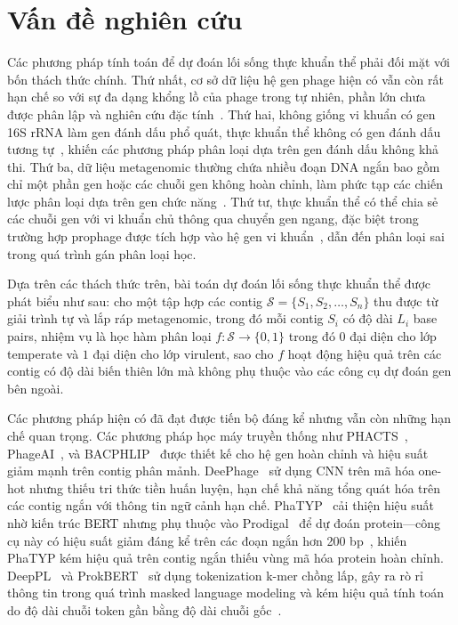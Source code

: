 \section{Vấn đề nghiên cứu}
\label{sec:problem}

Các phương pháp tính toán để dự đoán lối sống thực khuẩn thể phải đối mặt với bốn thách thức chính. Thứ nhất, cơ sở dữ liệu hệ gen phage hiện có vẫn còn rất hạn chế so với sự đa dạng khổng lồ của phage trong tự nhiên, phần lớn chưa được phân lập và nghiên cứu đặc tính~\cite{hayes2017metagenomic}. Thứ hai, không giống vi khuẩn có gen 16S rRNA làm gen đánh dấu phổ quát, thực khuẩn thể không có gen đánh dấu tương tự~\cite{mokili2012metagenomics}, khiến các phương pháp phân loại dựa trên gen đánh dấu không khả thi. Thứ ba, dữ liệu metagenomic thường chứa nhiều đoạn DNA ngắn bao gồm chỉ một phần gen hoặc các chuỗi gen không hoàn chỉnh, làm phức tạp các chiến lược phân loại dựa trên gen chức năng~\cite{jiang2017ensvmb}. Thứ tư, thực khuẩn thể có thể chia sẻ các chuỗi gen với vi khuẩn chủ thông qua chuyển gen ngang, đặc biệt trong trường hợp prophage được tích hợp vào hệ gen vi khuẩn~\cite{rozov2017recycler}, dẫn đến phân loại sai trong quá trình gán phân loại học.

Dựa trên các thách thức trên, bài toán dự đoán lối sống thực khuẩn thể được phát biểu như sau: cho một tập hợp các contig $\mathcal{S} = \{S_1, S_2, \ldots, S_n\}$ thu được từ giải trình tự và lắp ráp metagenomic, trong đó mỗi contig $S_i$ có độ dài $L_i$ base pairs, nhiệm vụ là học hàm phân loại $f: \mathcal{S} \rightarrow \{0, 1\}$ trong đó $0$ đại diện cho lớp temperate và $1$ đại diện cho lớp virulent, sao cho $f$ hoạt động hiệu quả trên các contig có độ dài biến thiên lớn mà không phụ thuộc vào các công cụ dự đoán gen bên ngoài.

Các phương pháp hiện có đã đạt được tiến bộ đáng kể nhưng vẫn còn những hạn chế quan trọng. Các phương pháp học máy truyền thống như PHACTS~\cite{mcnair2012phacts}, PhageAI~\cite{tynecki2020phageai}, và BACPHLIP~\cite{hockenberry2021bacphlip} được thiết kế cho hệ gen hoàn chỉnh và hiệu suất giảm mạnh trên contig phân mảnh. DeePhage~\cite{wu2021deephage} sử dụng CNN trên mã hóa one-hot nhưng thiếu tri thức tiền huấn luyện, hạn chế khả năng tổng quát hóa trên các contig ngắn với thông tin ngữ cảnh hạn chế. PhaTYP~\cite{shang2023phatyp} cải thiện hiệu suất nhờ kiến trúc BERT nhưng phụ thuộc vào Prodigal~\cite{hyatt2010prodigal} để dự đoán protein—công cụ này có hiệu suất giảm đáng kể trên các đoạn ngắn hơn 200 bp~\cite{trimble2012short}, khiến PhaTYP kém hiệu quả trên contig ngắn thiếu vùng mã hóa protein hoàn chỉnh. DeepPL~\cite{zhang2024deeppl} và ProkBERT~\cite{ligeti2024prokbert} sử dụng tokenization k-mer chồng lấp, gây ra rò rỉ thông tin trong quá trình masked language modeling và kém hiệu quả tính toán do độ dài chuỗi token gần bằng độ dài chuỗi gốc~\cite{zhou2023dnabert}.
